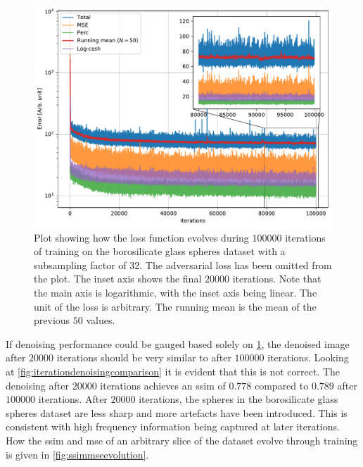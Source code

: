\begin{figure}[htbp]
  \centering
  \includegraphics[width=.8\textwidth]{figures/losstomo00058ns32itd4mse035logcosh3depth1.pdf}
  \caption[Loss function evolution during training]{Plot showing how the loss function evolves during $100000$ iterations of training on the borosilicate glass spheres dataset with a subsampling factor of 32. The adversarial loss has been omitted from the plot. The inset axis shows the final $20000$ iterations. Note that the main axis is logarithmic, with the inset axis being linear. The unit of the loss is arbitrary. The running mean is the mean of the previous $50$ values. }
  \label{fig:losstomo00058noadv}
\end{figure}

If denoising performance could be gauged based solely on \cref{fig:losstomo00058noadv}, the denoised image after $20000$ iterations should be very similar to after $100000$ iterations. Looking at \cref{fig:iterationdenoisingcomparison} it is evident that this is not correct. The denoising after $20000$ iterations achieves an \gls{ssim} of $0.778$ compared to $0.789$ after $100000$ iterations. After $20000$ iterations, the spheres in the borosilicate glass spheres dataset are less sharp and more artefacts have been introduced. This is consistent with high frequency information being captured at later iterations. How the \gls{ssim} and \gls{mse} of an arbitrary slice of the dataset evolve through training is given in \cref{fig:ssimmseevolution}. 

